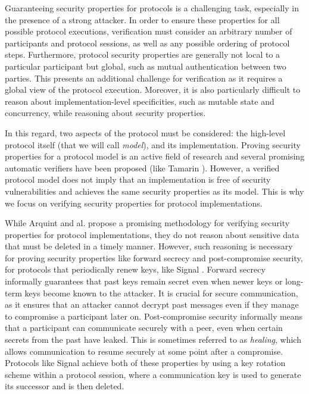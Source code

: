 Guaranteeing security properties for protocols is a challenging task, especially in the presence of a strong attacker.
In order to ensure these properties for all possible protocol executions, verification must consider an arbitrary number of participants and protocol sessions, as well as any possible ordering of protocol steps. Furthermore, protocol security properties are generally not local to a particular participant but global, such as mutual authentication between two parties. This presents an additional challenge for verification as it requires a global view of the protocol execution.
Moreover, it is also particularly difficult to reason about implementation-level specificities, such as mutable state and concurrency, while reasoning about security properties.

In this regard, two aspects of the protocol must be considered: the high-level protocol itself (that we will call \emph{model}), and its implementation. Proving security properties for a protocol model is an active field of research and several promising automatic verifiers have been proposed (like Tamarin \cite{}). However, a verified protocol model does not imply that an implementation is free of security vulnerabilities and achieves the same security properties as its model. This is why we focus on verifying security properties for protocol implementations.

While Arquint and al.\cite{} propose a promising methodology for verifying security properties for protocol implementations, they do not reason about sensitive data that must be deleted in a timely manner.
However, such reasoning is necessary for proving security properties like forward secrecy and post-compromise security, for protocols that periodically renew keys, like Signal \cite{}.
Forward secrecy informally guarantees that past keys remain secret even when newer keys or long-term keys become known to the attacker.
It is crucial for secure communication, as it ensures that an attacker cannot decrypt past messages even if they manage to compromise a participant later on.
Post-compromise security informally means that a participant can communicate securely with a peer, even when certain secrets from the past have leaked.
This is sometimes referred to as \emph{healing}, which allows communication to resume securely at some point after a compromise.
Protocols like Signal achieve both of these properties by using a key rotation scheme within a protocol session, where a communication key is used to generate its successor and is then deleted.

